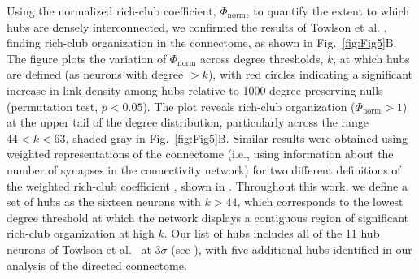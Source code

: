 \documentclass[10pt,letterpaper]{article}
\begin{document}
Using the normalized rich-club coefficient, $\Phi_\mathrm{norm}$, to quantify the extent to which hubs are densely interconnected, we confirmed the results of Towlson et al. \cite{Towlson2013}, finding rich-club organization in the connectome, as shown in Fig.~\ref{fig:Fig5}B.
The figure plots the variation of $\Phi_\mathrm{norm}$ across degree thresholds, $k$, at which hubs are defined (as neurons with degree $>k$), with red circles indicating a significant increase in link density among hubs relative to 1000 degree-preserving nulls (permutation test, $p < 0.05$).
The plot reveals rich-club organization ($\Phi_\mathrm{norm} > 1$) at the upper tail of the degree distribution, particularly across the range $44 < k < 63$, shaded gray in Fig.~\ref{fig:Fig5}B.
Similar results were obtained using weighted representations of the connectome (i.e., using information about the number of synapses in the connectivity network) for two different definitions of the weighted rich-club coefficient \cite{Opsahl2008}, shown in .
Throughout this work, we define a set of hubs as the sixteen neurons with $k > 44$, which corresponds to the lowest degree threshold at which the network displays a contiguous region of significant rich-club organization at high $k$.
Our list of hubs includes all of the 11 hub neurons of Towlson et al.~\cite{Towlson2013} at $3 \sigma$ (see ), with five additional hubs identified in our analysis of the directed connectome.
\end{document}
